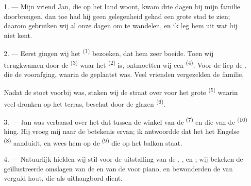 
\VUsaut{4.0mm}
\VUsaut{3.0mm}

\VUsaut{3.0mm}

1. --- Mijn vriend Jan, die op het land woont, kwam drie dagen bij mijn familie doorbrengen.
 dan toe had hij geen gelegenheid gehad een grote stad te zien; daarom gebruiken
wij al onze dagen om te wandelen, en ik leg hem uit wat hij niet kent.

2. --- Eerst gingen wij het  \textsuperscript{(1)} bezoeken, dat hem
zeer boeide. Toen wij terugkwamen door de  \textsuperscript{(3)} waar het
 \textsuperscript{(2)} is, ontmoetten wij een 
\textsuperscript{(4)}. Voor de
 liep de , die de 
voorafging, waarin de  geplaatst was. Veel vrienden vergezelden de
 familie.

Nadat de stoet voorbij was, staken wij de straat over voor het grote
 \textsuperscript{(5)} waarin veel 
 dronken op het terras, beschut door de glazen 
\textsuperscript{(6)}.

3. --- Jan was verbaasd over het  dat tussen de winkel van de
 \textsuperscript{(7)} en die van de 
\textsuperscript{(10)} hing. Hij vroeg mij naar de betekenis ervan; ik antwoordde dat het het
Engelse  \textsuperscript{(8)} aanduidt, en wees hem op de 
\textsuperscript{(9)} die op het balkon staat.

\VUsaut{3.0mm}

4. --- Natuurlijk hielden wij stil voor de uitstalling van de
, ,  en
; wij bekeken de geïllustreerde omslagen van de
 en van de  voor piano, en bewonderden
de  van verguld hout, die als uithangbord dient.

